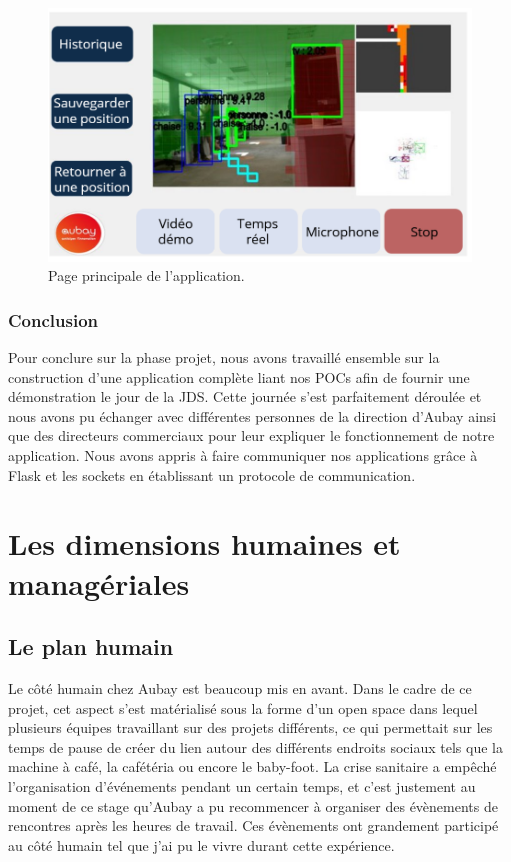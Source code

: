 \documentclass[11pt]{article}
\begin{document}
        \begin{figure}[hbt]  
          \includegraphics[width=\textwidth]{Application.png}    
          \caption{Page principale de l'application.}
          \label{fig:Application}
        \end{figure}     

      \subsubsection{Conclusion}
        Pour conclure sur la phase projet, nous avons travaillé ensemble sur la construction d'une application complète liant nos POCs afin de
        fournir une démonstration le jour de la JDS. Cette journée s'est parfaitement déroulée et nous avons pu échanger avec différentes
        personnes de la direction d'Aubay ainsi que des directeurs commerciaux pour leur expliquer le fonctionnement de notre application.
        Nous avons appris à faire communiquer nos applications grâce à Flask et les sockets en établissant un protocole de communication.

  \pagebreak

  \section{Les dimensions humaines et managériales} 
    \subsection{Le plan humain}
      Le côté humain chez Aubay est beaucoup mis en avant. Dans le cadre de ce projet, cet aspect s'est 
      matérialisé sous la forme d'un open space dans lequel plusieurs équipes travaillant sur des projets 
      différents, ce qui permettait sur les temps de pause de créer du lien autour des différents endroits 
      sociaux tels que la machine à café, la cafétéria ou encore le baby-foot. La crise sanitaire a empêché
      l'organisation d'événements pendant un certain temps, et c'est justement au moment de ce stage qu'Aubay 
      a pu recommencer à organiser des évènements de rencontres après les heures de travail. Ces évènements 
      ont grandement participé au côté humain tel que j'ai pu le vivre durant cette expérience.
\end{document}
